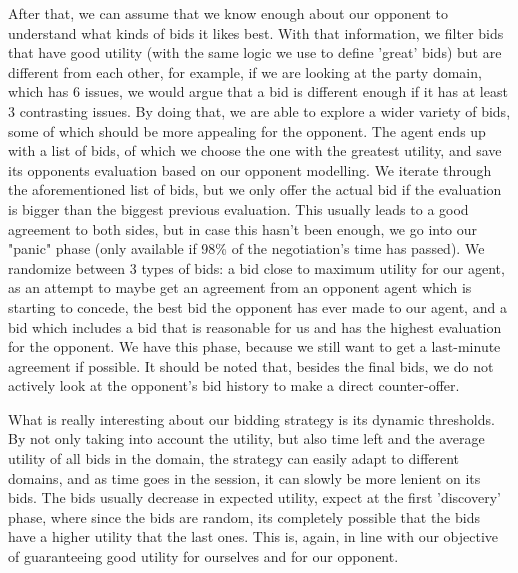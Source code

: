 \documentclass{article}
\begin{document}
\begin{enumerate}
\begin{itemize}
After that, we can assume that we know enough about our opponent to understand what kinds of bids it likes best. With that information, we filter bids that have good utility (with the same logic we use to define 'great' bids) but are different from each other, for example, if we are looking at the party domain, which has 6 issues, we would argue that a bid is different enough if it has at least 3 contrasting issues. By doing that, we are able to explore a wider variety of bids, some of which should be more appealing for the opponent. The agent ends up with a list of bids, of which we choose the one with the greatest utility, and save its opponents evaluation based on our opponent modelling. We iterate through the aforementioned list of bids, but we only offer the actual bid if the evaluation is bigger than the biggest previous evaluation. This usually leads to a good agreement to both sides, but in case this hasn't been enough, we go into our "panic" phase (only available if 98\% of the negotiation's time has passed). We randomize between 3 types of bids: a bid close to maximum utility for our agent, as an attempt to maybe get an agreement from an opponent agent which is starting to concede, the best bid the opponent has ever made to our agent, and a bid which includes a bid that is reasonable for us and has the highest evaluation for the opponent. We have this phase, because we still want to get a last-minute agreement if possible. It should be noted that, besides the final bids, we do not actively look at the opponent's bid history to make a direct counter-offer.

What is really interesting about our bidding strategy is its dynamic thresholds. By not only taking into account the utility, but also time left and the average utility of all bids in the domain, the strategy can easily adapt to different domains, and as time goes in the session, it can slowly be more lenient on its bids. The bids usually decrease in expected utility, expect at the first 'discovery' phase, where since the bids are random, its completely possible that the bids have a higher utility that the last ones. This is, again, in line with our objective of guaranteeing good utility for ourselves and for our opponent. 


\end{itemize}
\end{enumerate}
\end{document}
